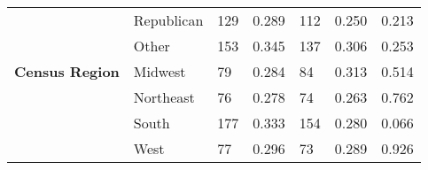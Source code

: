 \begin{tabular}{L{3cm} L{5cm} C{1.5cm} C{2.5cm} C{1.5cm} C{2.5cm} C{3cm}}
                                                          &                        Republican                        &                           129                            &                          0.289                           &                           112                            &                          0.250                           &                          0.213                            \\
                                                          &                          Other                           &                           153                            &                          0.345                           &                           137                            &                          0.306                           &                          0.253                            \\
\textbf{Census Region}                                    &                         Midwest                          &                            79                            &                          0.284                           &                            84                            &                          0.313                           &                          0.514                            \\
                                                          &                        Northeast                         &                            76                            &                          0.278                           &                            74                            &                          0.263                           &                          0.762                            \\
                                                          &                          South                           &                           177                            &                          0.333                           &                           154                            &                          0.280                           &                          0.066                            \\
                                                          &                           West                           &                            77                            &                          0.296                           &                            73                            &                          0.289                           &                          0.926                            \\

\end{tabular}
